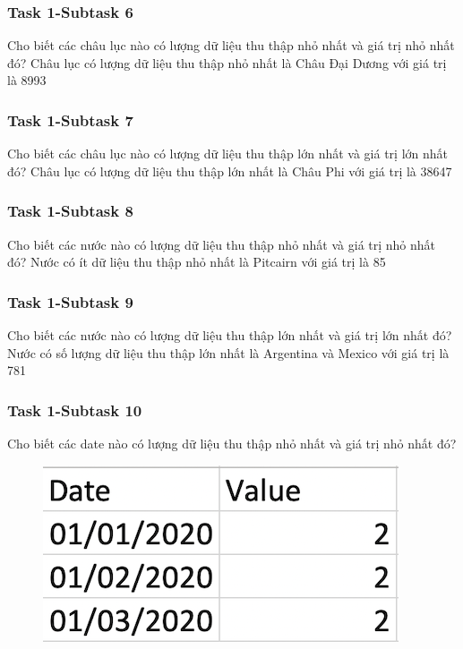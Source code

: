 \documentclass[english,10pt,table]{beamer}
\begin{document}
\frame
{
    \frametitle{Task 1-Subtask 6}
    \begin{block}{Cho biết các châu lục nào có lượng dữ liệu thu thập nhỏ nhất và giá trị nhỏ nhất đó?}
    Châu lục có lượng dữ liệu thu thập nhỏ nhất là Châu Đại Dương với giá trị là 8993
    \end{block}
}
\frame
{
    \frametitle{Task 1-Subtask 7}
    \begin{block}{Cho biết các châu lục nào có lượng dữ liệu thu thập lớn nhất và giá trị lớn nhất đó?}
    Châu lục có lượng dữ liệu thu thập lớn nhất là Châu Phi với giá trị là 38647
    \end{block}
}
\frame
{
    \frametitle{Task 1-Subtask 8}
    \begin{block}{Cho biết các nước nào có lượng dữ liệu thu thập nhỏ nhất và giá trị nhỏ nhất đó?}
    Nước có ít dữ liệu thu thập nhỏ nhất là Pitcairn với giá trị là 85
    \end{block}
}
\frame
{
    \frametitle{Task 1-Subtask 9}
    \begin{block}{Cho biết các nước nào có lượng dữ liệu thu thập lớn nhất và giá trị lớn nhất đó?}
    Nước có số lượng dữ liệu thu thập lớn nhất là Argentina và Mexico với giá trị là 781
    \end{block}
}
\frame
{
    \frametitle{Task 1-Subtask 10}
    \begin{block}{Cho biết các date nào có lượng dữ liệu thu thập nhỏ nhất và giá trị nhỏ nhất đó?}
    \begin{figure}[H]
				\centering
				\includegraphics{images/1.10.png}
			\end{figure}
    \end{block}
}
\frame
\end{document}

